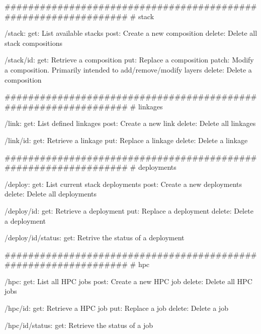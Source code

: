 \documentclass[11pt]{article}
\begin{document}
  ################################################################
  # stack

  /stack:
    get: List available stacks
    post: Create a new composition
    delete: Delete all stack compositions

  /stack/{id}:
    get: Retrieve a composition
    put: Replace a composition
    patch: Modify a composition. Primarily intended to add/remove/modify layers
    delete: Delete a composition

  ################################################################
  # linkages

  /link:
    get: List defined linkages
    post: Create a new link
    delete: Delete all linkages

  /link/{id}:
    get: Retrieve a linkage
    put: Replace a linkage
    delete: Delete a linkage

  ################################################################
  # deployments

  /deploy:
    get: List current stack deployments
    post: Create a new deployments
    delete: Delete all deployments

  /deploy/{id}:
    get: Retrieve a deployment
    put: Replace a deployment
    delete: Delete a deployment

  /deploy/{id}/status:
    get: Retrive the status of a deployment

  ################################################################
  # hpc

  /hpc:
    get: List all HPC jobs
    post: Create a new HPC job
    delete: Delete all HPC jobs

  /hpc/{id}:
    get: Retrieve a HPC job
    put: Replace a job
    delete: Delete a job

  /hpc/{id}/status:
    get: Retrieve the status of a job


 
\end{document}
